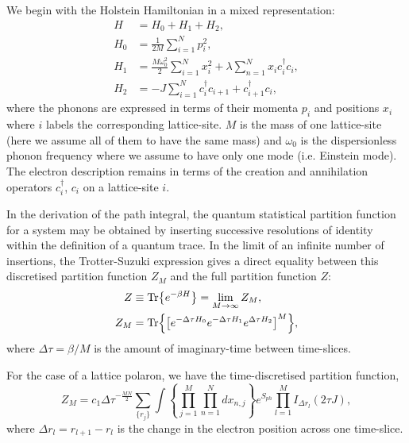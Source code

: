 We begin with the Holstein Hamiltonian in a mixed representation:
\begin{equation}
    \begin{aligned}
        H &= H_{0} + H_{1} + H_{2} , \\
        H_{0} &= \frac{1}{2M} \sum_{i=1}^N p_i^2 , \\
        H_{1} &= \frac{M \omega_0^2}{2} \sum_{i=1}^N x_i^2 + \lambda \sum_{n=1}^N x_i c^\dagger_i c_i , \\
        H_{2} &= -J \sum_{i=1}^N c^\dagger_i c_{i+1} + c_{i+1}^\dagger c_i ,
    \end{aligned}
\end{equation}
 where the phonons are expressed in terms of their momenta $p_i$ and positions $x_i$ where $i$ labels the corresponding lattice-site. $M$ is the mass of one lattice-site (here we assume all of them to have the same mass) and $\omega_0$ is the dispersionless phonon frequency where we assume to have only one mode (i.e. Einstein mode). The electron description remains in terms of the creation and annihilation operators $c^\dagger_i$, $c_i$ on a lattice-site $i$.
\newline

In the derivation of the path integral, the quantum statistical partition function for a system may be obtained by inserting successive resolutions of identity within the definition of a quantum trace. In the limit of an infinite number of insertions, the Trotter-Suzuki expression \cite{trotter_product_1959, hatano_finding_2005} gives a direct equality between this discretised partition function $Z_M$ and the full partition function $Z$:
\begin{equation}
    \begin{aligned}
        Z &\equiv \Tr{e^{-\beta H}} = \lim_{M\to\infty} Z_M , \\
        Z_M &= \Tr{\left[ e^{-\Delta\tau H_0} e^{-\Delta\tau H_1} e^{\Delta\tau H_2} \right]^M} ,
    \end{aligned}
\end{equation}
where $\Delta\tau = \beta / M$ is the amount of imaginary-time between time-slices.
\newline

For the case of a lattice polaron, we have the time-discretised partition function,
\begin{equation}
    Z_M = c_1 {\Delta\tau}^{-\frac{MN}{2}} \sum_{\{r_j\}} \int \left\{ \prod_{j=1}^M \prod_{n=1}^N dx_{n,j} \right\} e^{S_{ph}} \prod_{l=1}^M I_{\Delta r_l}(2 \tau J) ,
\end{equation}
where $\Delta r_l = r_{l+1} - r_l$ is the change in the electron position across one time-slice.
\newline

